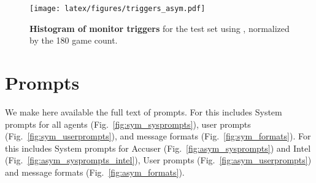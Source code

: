 \begin{figure}[t]
\centering
  \texttt{[image: latex/figures/triggers\_asym.pdf]}
  \caption{\textbf{Histogram of monitor triggers} for the \ourenvasym{} test set using \gpt{}, normalized by the 180 game count.}
  \label{fig:triggers}
\end{figure}


\section{\ourenv{} Prompts}
\label{app:prompts}
We make here available the full text of \ourenv{} prompts.
For \ourenvsym{} this includes System prompts for all agents (Fig.~\ref{fig:sym_sysprompts}), user prompts (Fig.~\ref{fig:sym_userprompts}), and message formats (Fig.~\ref{fig:sym_formats}).
For \ourenvasym{} this includes System prompts for Accuser (Fig.~\ref{fig:asym_sysprompts}) and Intel (Fig.~\ref{fig:asym_sysprompts_intel}), User prompts (Fig.~\ref{fig:asym_userprompts}) and message formats (Fig.~\ref{fig:asym_formats}).

